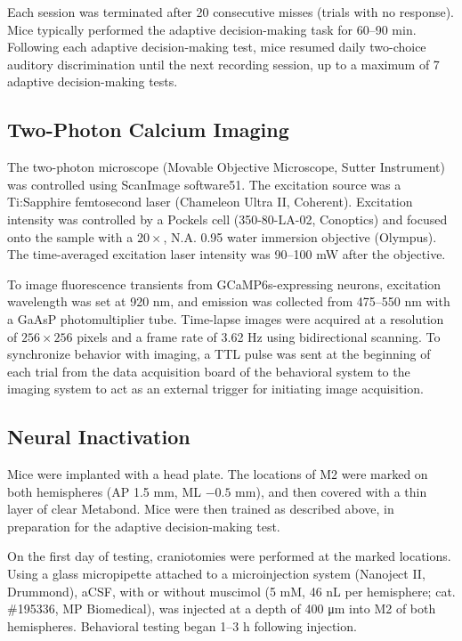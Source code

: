 Each session was terminated after 20 consecutive misses (trials with no response). Mice typically performed the adaptive decision-making task for 60--90 min. Following each adaptive decision-making test, mice resumed daily two-choice auditory discrimination until the next recording session, up to a maximum of 7 adaptive decision-making tests.

\subsection*{Two-Photon Calcium Imaging}
The two-photon microscope (Movable Objective Microscope, Sutter Instrument) was controlled using ScanImage software51. The excitation source was a Ti:Sapphire femtosecond laser (Chameleon Ultra II, Coherent). Excitation intensity was controlled by a Pockels cell (350-80-LA-02, Conoptics) and focused onto the sample with a $20\times$, N.A. 0.95 water immersion objective (Olympus). The time-averaged excitation laser intensity was 90--100 mW after the objective. 

To image fluorescence transients from GCaMP6s-expressing neurons, excitation wavelength was set at 920 nm, and emission was collected from 475--550 nm with a GaAsP photomultiplier tube. Time-lapse images were acquired at a resolution of $256 \times 256$ pixels and a frame rate of 3.62 Hz using bidirectional scanning. To synchronize behavior with imaging, a TTL pulse was sent at the beginning of each trial from the data acquisition board of the behavioral system to the imaging system to act as an external trigger for initiating image acquisition.

\subsection*{Neural Inactivation}
Mice were implanted with a head plate. The locations of M2 were marked on both hemispheres (AP 1.5 mm, ML $-0.5$ mm), and then covered with a thin layer of clear Metabond. Mice were then trained as described above, in preparation for the adaptive decision-making test. 

On the first day of testing, craniotomies were performed at the marked locations. Using a glass micropipette attached to a microinjection system (Nanoject II, Drummond), aCSF, with or without muscimol (5 mM, 46 nL per hemisphere; cat. \#195336, MP Biomedical), was injected at a depth of 400 \unit{\micro\meter} into M2 of both hemispheres. Behavioral testing began 1--3 h following injection. 


